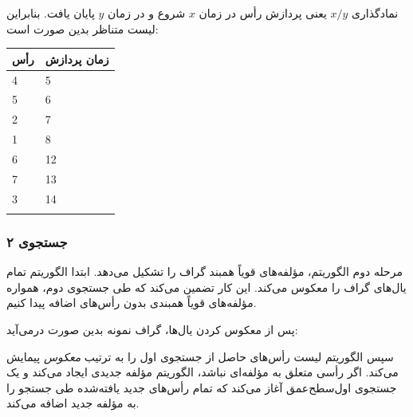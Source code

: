 نمادگذاری $x/y$ یعنی
پردازش رأس در زمان $x$ شروع
و در زمان $y$ پایان یافت.
بنابراین لیست متناظر بدین صورت است:

\begin{tabular}{ll}
\\
رأس & زمان پردازش \\
\hline
4 & 5 \\
5 & 6 \\
2 & 7 \\
1 & 8 \\
6 & 12 \\
7 & 13 \\
3 & 14 \\
\\
\end{tabular}
% 

\subsubsection{جستجوی ۲}

مرحله دوم الگوریتم،
مؤلفه‌های قویاً همبند گراف را تشکیل می‌دهد.
ابتدا الگوریتم تمام یال‌های گراف را معکوس می‌کند.
این کار تضمین می‌کند که طی جستجوی دوم،
همواره مؤلفه‌های قویاً همبندی بدون رأس‌های اضافه پیدا کنیم.

پس از معکوس کردن یال‌ها،
گراف نمونه بدین صورت درمی‌آید:
\begin{center}
\end{center}

سپس الگوریتم لیست رأس‌های حاصل از جستجوی اول را
به ترتیب \emph{معکوس} پیمایش می‌کند.
اگر رأسی متعلق به مؤلفه‌ای نباشد،
الگوریتم مؤلفه جدیدی ایجاد می‌کند
و یک جستجوی اول‌سطح‌عمق آغاز می‌کند
که تمام رأس‌های جدید یافته‌شده طی جستجو را
به مؤلفه جدید اضافه می‌کند.

